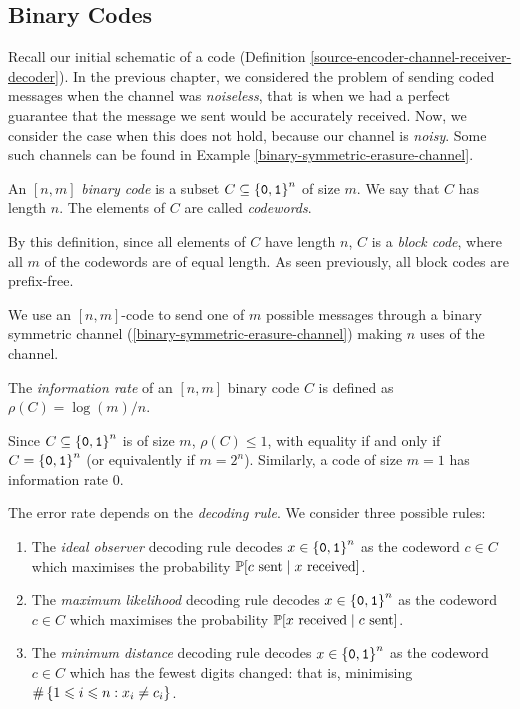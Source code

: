 \documentclass{article}
\begin{document}
\subsection{Binary Codes}
\label{section-error-control-binary-codes}

Recall our initial schematic of a code
(Definition \ref{source-encoder-channel-receiver-decoder}).
In the previous chapter, we considered the problem of sending coded messages
when the channel was \textit{noiseless},
that is when we had a perfect guarantee that
the message we sent would be accurately received.
Now, we consider the case when this does not hold,
because our channel is \textit{noisy}.
Some such channels can be found in Example \ref{binary-symmetric-erasure-channel}.

\begin{definition}
	\label{binary-code-n-m}
    An $[n, m]$ \textit{binary code}
    is a subset $C \subs \binset^n$ of size $m$.
    We say that $C$ has length $n$.
    The elements of $C$ are called \textit{codewords}.
\end{definition}

\begin{note}
	By this definition,
	since all elements of $C$ have length $n$,
	$C$ is a \textit{block code},
	where all $m$ of the codewords are of equal length.
	As seen previously, all block codes are prefix-free.
\end{note}

We use an $[n, m]$-code
to send one of $m$ possible messages through a binary symmetric channel
(\ref{binary-symmetric-erasure-channel})
making $n$ uses of the channel.

\begin{definition}
	\label{information-rate}
    The \textit{information rate} of an $[n, m]$ binary code $C$
    is defined as $\rho(C) = \log(m)/n$.
\end{definition}

\begin{corollary}
    Since $C \subs \binset^n$
    is of size $m$, $\rho(C) \leq 1$,
    with equality if and only if $C = \binset^n$
    (or equivalently if $m = 2^n$).
    Similarly, a code of size $m=1$ has information rate 0. 
\end{corollary}

The error rate depends on the \textit{decoding rule}.
We consider three possible rules:

\begin{enumerate}
    \item The \textit{ideal observer} decoding rule decodes $x \in \binset^n$ as the codeword $c \in C$ which maximises the probability $\P[c \text{ sent} \mid x \text{ received}]$.
    \item The \textit{maximum likelihood} decoding rule decodes $x \in \binset^n$ as the codeword $c \in C$ which maximises the probability $\P[x \text{ received} \mid c \text{ sent}]$.
    \item The \textit{minimum distance} decoding rule decodes $x \in \binset^n$ as the codeword $c \in C$ which has the fewest digits changed: that is, minimising $\#\set{1 \leq i \leq n : x_i \neq c_i}$.
\end{enumerate}
\end{document}
